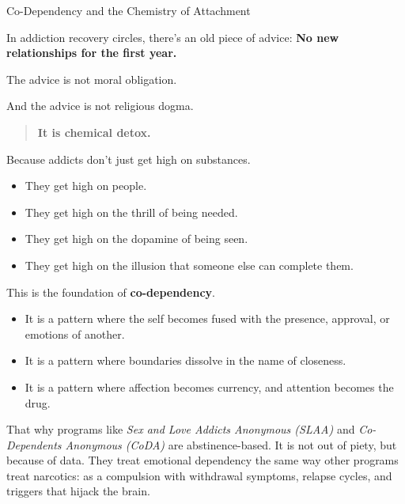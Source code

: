 \medskip 

\begin{PhilosophicalSidebar}{Co-Dependency and the Chemistry of Attachment}

    In addiction recovery circles, there’s an old piece of advice:  
    \textbf{No new relationships for the first year.}

    \medskip
    
    The advice is not moral obligation. 

    And the advice is not religious dogma.  

    \medskip

    \begin{quote}
        \centering
        \textbf{It is chemical detox.}
    \end{quote}

    \medskip
    
    Because addicts don’t just get high on substances.  

    \medskip

    \begin{itemize}
        \item They get high on people.  
        \item They get high on the thrill of being needed.  
        \item They get high on the dopamine of being seen.  
        \item They get high on the illusion that someone else can complete them.
    \end{itemize}
    
    \medskip
    
    This is the foundation of \textbf{co-dependency}.  

    \medskip

    \begin{itemize}
        \item It is a pattern where the self becomes fused with the presence, approval, or emotions of another.  
        \item It is a pattern where boundaries dissolve in the name of closeness.  
        \item It is a pattern where affection becomes currency, and attention becomes the drug.
    \end{itemize}
    
    \medskip

    That why programs like \textit{Sex and Love Addicts Anonymous (SLAA)} and 
    \textit{Co-Dependents Anonymous (CoDA)} are abstinence-based.
    It is not out of piety, but because of data.  
    They treat emotional dependency the same way other programs treat narcotics:  
    as a compulsion with withdrawal symptoms, relapse cycles, and triggers that hijack the brain.


\end{PhilosophicalSidebar}
